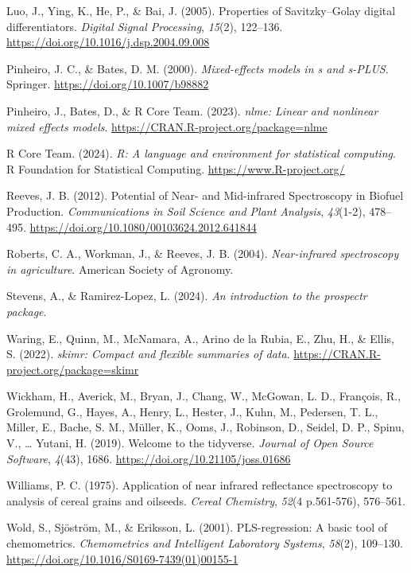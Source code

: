 \documentclass[
]{agujournal2019}
\newlength{\cslhangindent}
\newenvironment{CSLReferences}[2] %
 {\begin{list}{}{%
  \setlength{\itemindent}{0pt}
  \setlength{\leftmargin}{0pt}
  \setlength{\parsep}{0pt}
  \ifodd #1
   \setlength{\leftmargin}{\cslhangindent}
   \setlength{\itemindent}{-1\cslhangindent}
  \fi
  \setlength{\itemsep}{#2\baselineskip}}}
 {\end{list}}
\begin{document}
\begin{CSLReferences}{1}{0}
Luo, J., Ying, K., He, P., \& Bai, J. (2005). Properties of
{Savitzky}--{Golay} digital differentiators. \emph{Digital Signal
Processing}, \emph{15}(2), 122--136.
\url{https://doi.org/10.1016/j.dsp.2004.09.008}

Pinheiro, J. C., \& Bates, D. M. (2000). \emph{Mixed-effects models in s
and s-PLUS}. Springer. \url{https://doi.org/10.1007/b98882}

Pinheiro, J., Bates, D., \& R Core Team. (2023). \emph{{nlme}: Linear
and nonlinear mixed effects models}.
\url{https://CRAN.R-project.org/package=nlme}

R Core Team. (2024). \emph{{R}: A language and environment for
statistical computing}. R Foundation for Statistical Computing.
\url{https://www.R-project.org/}

Reeves, J. B. (2012). Potential of {Near}- and {Mid}-infrared
{Spectroscopy} in {Biofuel} {Production}. \emph{Communications in Soil
Science and Plant Analysis}, \emph{43}(1-2), 478--495.
\url{https://doi.org/10.1080/00103624.2012.641844}

Roberts, C. A., Workman, J., \& Reeves, J. B. (2004).
\emph{Near-infrared spectroscopy in agriculture}. American Society of
Agronomy.

Stevens, A., \& Ramirez-Lopez, L. (2024). \emph{An introduction to the
prospectr package}.

Waring, E., Quinn, M., McNamara, A., Arino de la Rubia, E., Zhu, H., \&
Ellis, S. (2022). \emph{{skimr}: Compact and flexible summaries of
data}. \url{https://CRAN.R-project.org/package=skimr}

Wickham, H., Averick, M., Bryan, J., Chang, W., McGowan, L. D.,
François, R., Grolemund, G., Hayes, A., Henry, L., Hester, J., Kuhn, M.,
Pedersen, T. L., Miller, E., Bache, S. M., Müller, K., Ooms, J.,
Robinson, D., Seidel, D. P., Spinu, V., \ldots{} Yutani, H. (2019).
Welcome to the {tidyverse}. \emph{Journal of Open Source Software},
\emph{4}(43), 1686. \url{https://doi.org/10.21105/joss.01686}

Williams, P. C. (1975). Application of near infrared reflectance
spectroscopy to analysis of cereal grains and oilseeds. \emph{Cereal
Chemistry}, \emph{52}(4 p.561-576), 576--561.

Wold, S., Sjöström, M., \& Eriksson, L. (2001). {PLS}-regression: A
basic tool of chemometrics. \emph{Chemometrics and Intelligent
Laboratory Systems}, \emph{58}(2), 109--130.
\url{https://doi.org/10.1016/S0169-7439(01)00155-1}

\end{CSLReferences}
\end{document}

